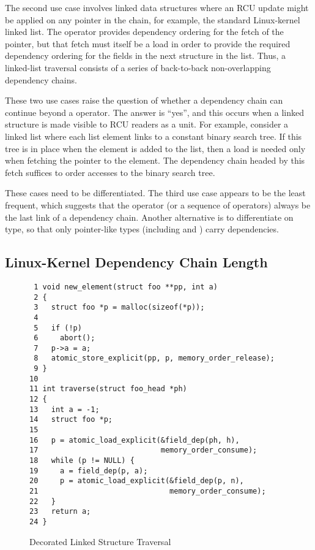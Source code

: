 \documentclass[letterpaper,twocolumn,10pt]{article}
\begin{document}
The second use case involves linked data structures where an RCU update
might be applied on any pointer in the chain, for example, the standard
Linux-kernel linked list.
The \co{->} operator provides dependency ordering for the fetch of the
 pointer, but that fetch must itself be a 
load in order to provide the required dependency ordering for the fields
in the next structure in the list.
Thus, a linked-list traversal consists of a series of back-to-back
non-overlapping dependency chains.

These two use cases raise the question of whether a dependency chain
can continue beyond a \co{->} operator.
The answer is ``yes'', and this occurs when a linked structure is
made visible to RCU readers as a unit.
For example, consider a linked list where each list element links to
a constant binary search tree.
If this tree is in place when the element is added to the list, then
a  load is needed only when fetching the
pointer to the element.
The dependency chain headed by this fetch suffices to order accesses
to the binary search tree.

These cases need to be differentiated.
The third use case appears to be the least frequent, which suggests
that the \co{->} operator (or a sequence of \co{->} operators)
always be the last link of a dependency
chain.
Another alternative is to differentiate on type, so that only pointer-like
types (including  and ) carry dependencies.

\subsection{Linux-Kernel Dependency Chain Length}
\label{sec:Linux-Kernel Dependency Chain Length}

\begin{figure}[tbp]
{ \scriptsize
\begin{verbatim}
 1 void new_element(struct foo **pp, int a)
 2 {
 3   struct foo *p = malloc(sizeof(*p));
 4 
 5   if (!p)
 6     abort();
 7   p->a = a;
 8   atomic_store_explicit(pp, p, memory_order_release);
 9 }
10 
11 int traverse(struct foo_head *ph)
12 {
13   int a = -1;
14   struct foo *p;
15 
16   p = atomic_load_explicit(&field_dep(ph, h),
17                            memory_order_consume);
18   while (p != NULL) {
19     a = field_dep(p, a);
20     p = atomic_load_explicit(&field_dep(p, n),
21                              memory_order_consume);
22   }
23   return a;
24 }
\end{verbatim}
}
\caption{Decorated Linked Structure Traversal}
\label{fig:Decorated Linked Structure Traversal}
\end{figure}
\end{document}
